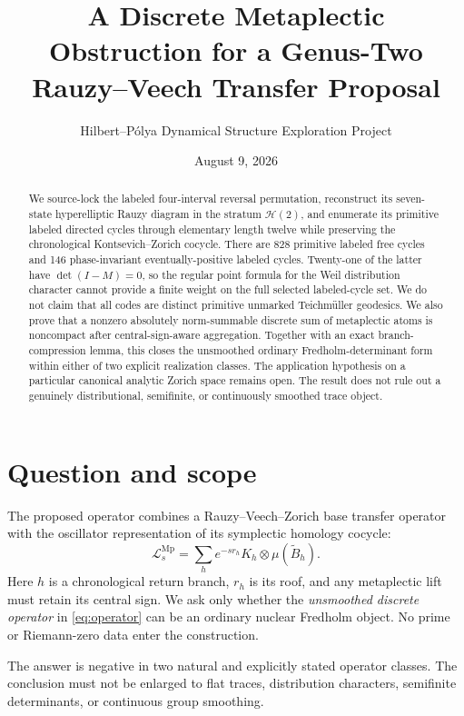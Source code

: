 \documentclass[11pt]{article}
\title{A Discrete Metaplectic Obstruction for a Genus-Two\\
Rauzy--Veech Transfer Proposal}
\author{Hilbert--P\'olya Dynamical Structure Exploration Project}
\date{August 9, 2026}
\theoremstyle{remark}
\newcommand{\Mp}{\operatorname{Mp}}
\newcommand{\cH}{\mathcal H}
\newcommand{\cL}{\mathcal L}
\begin{document}
\maketitle

\begin{abstract}
We source-lock the labeled four-interval reversal permutation, reconstruct its
seven-state hyperelliptic Rauzy diagram in the stratum $\cH(2)$, and enumerate
its primitive labeled directed cycles through elementary length twelve while
preserving the chronological Kontsevich--Zorich cocycle.  There are 828
primitive labeled free cycles and 146 phase-invariant eventually-positive
labeled cycles.  Twenty-one of the latter have $\det(I-M)=0$, so the regular
point formula for the Weil distribution character cannot provide a finite
weight on the full selected labeled-cycle set.  We do not claim that all
codes are distinct primitive unmarked Teichm\"uller geodesics.  We also prove
that a nonzero absolutely norm-summable discrete
sum of metaplectic atoms is noncompact after central-sign-aware aggregation.
Together with an exact branch-compression lemma, this closes the unsmoothed
ordinary Fredholm-determinant form within either of two explicit realization
classes.  The application hypothesis on a particular canonical analytic
Zorich space remains open.  The result does not rule out a genuinely
distributional, semifinite, or continuously smoothed trace object.
\end{abstract}

\section{Question and scope}

The proposed operator combines a Rauzy--Veech--Zorich base transfer operator
with the oscillator representation of its symplectic homology cocycle:
\begin{equation}\label{eq:operator}
  \cL_s^{\Mp}=\sum_h e^{-sr_h}K_h\otimes\mu(\widetilde B_h).
\end{equation}
Here $h$ is a chronological return branch, $r_h$ is its roof, and any
metaplectic lift must retain its central sign.  We ask only whether the
\emph{unsmoothed discrete operator} in \eqref{eq:operator} can be an ordinary
nuclear Fredholm object.  No prime or Riemann-zero data enter the construction.

The answer is negative in two natural and explicitly stated operator classes.
The conclusion must not be enlarged to flat traces, distribution characters,
semifinite determinants, or continuous group smoothing.
\end{document}
